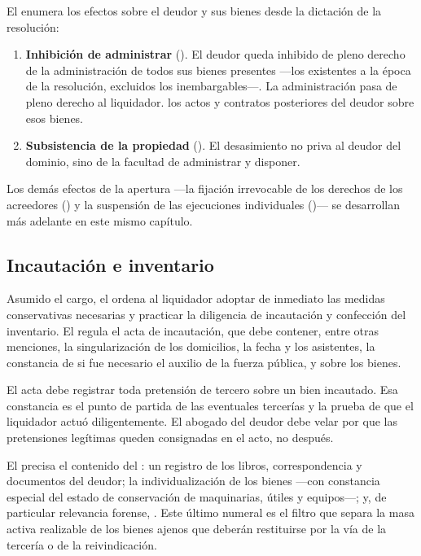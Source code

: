 El  enumera los efectos sobre el deudor y sus bienes desde la dictación de la
resolución:

\begin{enumerate}
  \item \textbf{Inhibición de administrar} (). El deudor queda inhibido de pleno
  derecho de la administración de todos sus bienes presentes ---los existentes a la época de
  la resolución, excluidos los inembargables---. La administración pasa de pleno derecho al
  liquidador.  los actos y contratos posteriores del deudor sobre esos
  bienes.
  \item \textbf{Subsistencia de la propiedad} (). El desasimiento no priva al deudor
  del dominio, sino de la facultad de administrar y disponer.
\end{enumerate}

Los demás efectos de la apertura ---la fijación irrevocable de los derechos de los acreedores
() y la suspensión de las ejecuciones individuales ()--- se desarrollan más
adelante en este mismo capítulo.

\subsection{Incautación e inventario}

Asumido el cargo, el  ordena al liquidador adoptar de inmediato las medidas
conservativas necesarias y practicar la diligencia de incautación y confección del
inventario. El  regula el acta de incautación, que debe contener, entre otras
menciones, la singularización de los domicilios, la fecha y los asistentes, la constancia
de si fue necesario el auxilio de la fuerza pública, y  sobre los bienes.

\begin{practica}
El acta debe registrar toda pretensión de tercero sobre un bien incautado. Esa constancia
es el punto de partida de las eventuales tercerías y la prueba de que el liquidador actuó
diligentemente. El abogado del deudor debe velar por que las pretensiones legítimas queden
consignadas en el acto, no después.
\end{practica}

El  precisa el contenido del : un registro de los libros,
correspondencia y documentos del deudor; la individualización de los bienes ---con constancia
especial del estado de conservación de maquinarias, útiles y equipos---; y, de particular
relevancia forense, . Este último
numeral es el filtro que separa la masa activa realizable de los bienes ajenos que deberán
restituirse por la vía de la tercería o de la reivindicación.

